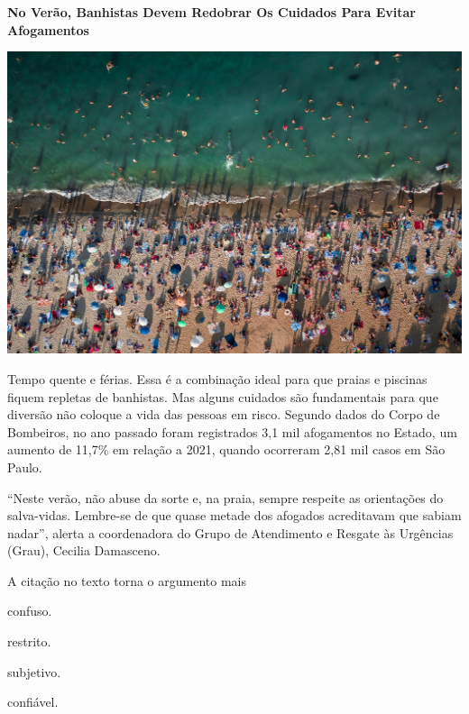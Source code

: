 \begin{myquote}
\textbf{No Verão, Banhistas Devem Redobrar Os Cuidados Para Evitar
Afogamentos}

\begin{center}
\includegraphics[width=.8\textwidth]{media/image43.jpg}
\end{center}

Tempo quente e férias. Essa é a combinação ideal para que praias e
piscinas fiquem repletas de banhistas. Mas alguns cuidados são
fundamentais para que diversão não coloque a vida das pessoas em risco.
Segundo dados do Corpo de Bombeiros, no ano passado foram registrados
3,1 mil afogamentos no Estado, um aumento de 11,7\% em relação a 2021,
quando ocorreram 2,81 mil casos em São Paulo.

``Neste verão, não abuse da sorte e, na praia, sempre respeite as
orientações do salva-vidas. Lembre-se de que quase metade dos afogados
acreditavam que sabiam nadar'', alerta a coordenadora do Grupo de
Atendimento e Resgate às Urgências (Grau), Cecilia Damasceno.

\end{myquote}

A citação no texto torna o
argumento mais

\begin{multicols}{2}
\begin{escolha}
  \item confuso.

  \item restrito.

  \item subjetivo.

  \item confiável.
\end{escolha}
\end{multicols}

